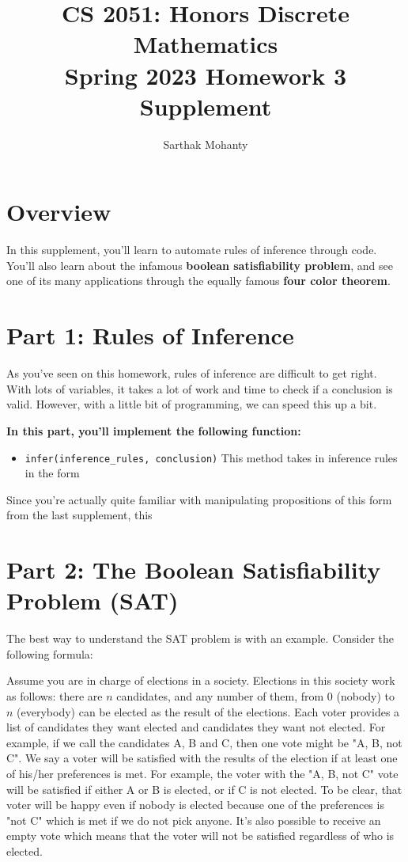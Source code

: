 \documentclass{article}
\title{\vspace{-1cm}CS 2051: Honors Discrete Mathematics \\Spring 2023 Homework 3 Supplement}
\author{Sarthak Mohanty}
\date{}
\begin{document}
\maketitle

\section{Overview}

    In this supplement, you'll learn to automate rules of inference through code. You'll also learn about the infamous \textbf{boolean satisfiability problem}, and see one of its many applications through the equally famous \textbf{four color theorem}.

\section*{Part 1: Rules of Inference}
    As you've seen on this homework, rules of inference are difficult to get right. With lots of variables, it takes a lot of work and time to check if a conclusion is valid. However, with a little bit of programming, we can speed this up a bit. 
    
    \textbf{In this part, you'll implement the following function:}
    
    \begin{itemize}
        \item \lstinline{infer(inference_rules, conclusion)} This method takes in inference rules in the form 
    \end{itemize}

    Since you're actually quite familiar with manipulating propositions of this form from the last supplement, this 


\section*{Part 2: The Boolean Satisfiability Problem (SAT)}

The best way to understand the SAT problem is with an example. Consider the following formula:



Assume you are in charge of elections in a society. Elections in this society work as follows: there are $n$ candidates, and any number of them, from 0 (nobody) to $n$ (everybody) can be elected as the result of the elections. Each voter provides a list of candidates they want elected and candidates they want not elected. For example, if we call the candidates A, B and C, then one vote might be "A, B, not C". We say a voter will be satisfied with the results of the election if at least one of his/her preferences is met. For example, the voter with the "A, B, not C" vote will be satisfied if either A or B is elected, or if C is not elected. To be clear, that voter will be happy even if nobody is elected because one of the preferences is "not C" which is met if we do not pick anyone. It's also possible to receive an empty vote which means that the voter will not be satisfied regardless of who is elected.
\end{document}
